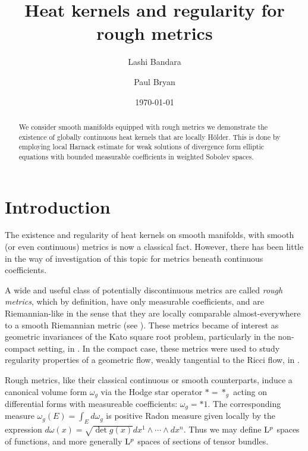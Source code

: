 \documentclass[a4paper, 12pt]{amsart}
\begin{document}
\title{Heat kernels and regularity for rough metrics}

\author{Lashi Bandara}
\author{Paul Bryan}

\curraddr{}
\email{}
\date{\today}

\dedicatory{}
\subjclass[2010]{}
\keywords{}

\parindent0cm
\setlength{\parskip}{\baselineskip}


\begin{abstract}
We consider smooth manifolds equipped with rough metrics
we demonstrate the existence of globally continuous
heat kernels that are locally Hölder. This is done 
by employing local Harnack estimate for weak
solutions of divergence form elliptic equations
with bounded measurable coefficients in weighted Sobolev
spaces.
\end{abstract}

\maketitle

\section{Introduction}
\label{sec:intro}
The existence and regularity of heat kernels on smooth manifolds, with smooth (or even continuous)
metrics is now a classical fact. However, there has been
little in the way of investigation
of this topic for metrics beneath continuous coefficients. 

A wide and useful class of potentially discontinuous metrics are called \emph{rough metrics}, 
which by definition, have only measurable coefficients, and are Riemannian-like in the sense
that they are locally comparable almost-everywhere to a smooth Riemannian metric (see ).
These metrics became of interest as geometric invariances of the Kato square
root problem, particularly in the non-compact setting, in \cite{BMc, BRough}. 
In the compact case, these metrics were used to study regularity properties
of a geometric flow, weakly tangential to the Ricci flow, 
in \cite{BLM, BCont}. 

Rough metrics, like their classical continuous
or smooth counterparts, induce a canonical volume form \(\omega_g\) via the Hodge star operator \(\ast = \ast_g\) acting on differential forms with measureable coefficients: \(\omega_g = *1\). The corresponding measure \(\omega_g(E) = \int_E d\omega_g\) is positive Radon measure given locally by the expression $d\omega(x) = \sqrt{\det g(x)} dx^1 \wedge \cdots \wedge dx^n$. Thus we may define \({\rm L}^{p}_{\rm {}}\) spaces of functions, and more generally \({\rm L}^{p}_{\rm {}}\) spaces of sections of tensor bundles.
\end{document}
